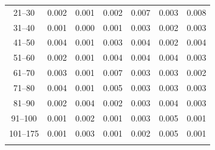 \begin{table}
\begin{tabular}{ccccccc}
21--30 & 0.002 & 0.001 & 0.002 & 0.007 & 0.003 & 0.008\\
31--40 & 0.001 & 0.000 & 0.001 & 0.003 & 0.002 & 0.003\\
41--50 & 0.004 & 0.001 & 0.003 & 0.004 & 0.002 & 0.004\\
51--60 & 0.002 & 0.001 & 0.004 & 0.004 & 0.004 & 0.003\\
61--70 & 0.003 & 0.001 & 0.007 & 0.003 & 0.003 & 0.002\\
71--80 & 0.004 & 0.001 & 0.005 & 0.003 & 0.003 & 0.003\\
81--90 & 0.002 & 0.004 & 0.002 & 0.003 & 0.004 & 0.003\\
91--100 & 0.001 & 0.002 & 0.001 & 0.003 & 0.005 & 0.001\\
101--175 & 0.001 &  0.003 & 0.001 & 0.002 &  0.005 & 0.001\\
\noalign{\smallskip}\hline
\end{tabular}
\end{table}





%
%




